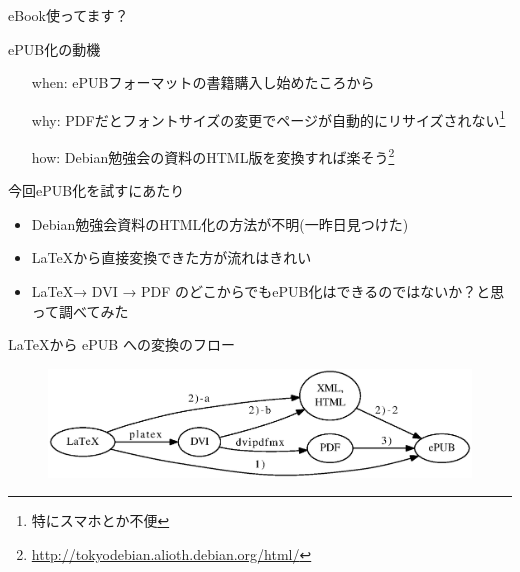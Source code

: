 \frame{\titlepage{}}

\begin{frame}
\begin{center}
{\Huge eBook使ってます？}
\end{center}
\end{frame}

\begin{frame}{ePUB化の動機}
 \begin{itemize}
  \item[when:] ePUBフォーマットの書籍購入し始めたころから
  \item[why:] PDFだとフォントサイズの変更でページが自動的にリサイズされない\footnote{特にスマホとか不便}
  \item[how:] Debian勉強会の資料のHTML版を変換すれば楽そう\footnote{\url{http://tokyodebian.alioth.debian.org/html/}}
 \end{itemize}
\end{frame}

\begin{frame}{今回ePUB化を試すにあたり}
  \begin{itemize}
  \item Debian勉強会資料のHTML化の方法が不明(一昨日見つけた)
  \item \LaTeX から直接変換できた方が流れはきれい
  \item \LaTeX → DVI → PDF のどこからでもePUB化はできるのではないか？と思って調べてみた
  \end{itemize}
\end{frame}


\begin{frame}{\LaTeX から ePUB への変換のフロー}
\begin{figure}[H]
\begin{center}
  \includegraphics[width=1.0\hsize]{image201308/latex-epub.eps}
 \label{fig:convert-latex-to-epub}
\end{center}
\end{figure}
\end{frame}

